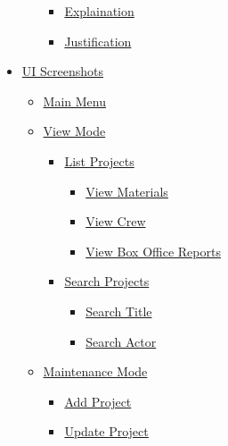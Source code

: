 \documentclass[
  english,
  a4paper,
,tablecaptionabove
]{scrartcl}
\providecommand{\tightlist}{%
  \setlength{\itemsep}{0pt}\setlength{\parskip}{0pt}}
\begin{document}
\begin{itemize}
\begin{itemize}
    \begin{itemize}
    \tightlist
    \item
      \protect\hyperlink{explaination-1}{Explaination}
    \item
      \protect\hyperlink{justification-1}{Justification}
    \end{itemize}
  \end{itemize}
\item
  \protect\hyperlink{ui-screenshots}{UI Screenshots}

  \begin{itemize}
  \tightlist
  \item
    \protect\hyperlink{main-menu}{Main Menu}
  \item
    \protect\hyperlink{view-mode}{View Mode}

    \begin{itemize}
    \tightlist
    \item
      \protect\hyperlink{list-projects}{List Projects}

      \begin{itemize}
      \tightlist
      \item
        \protect\hyperlink{view-materials}{View Materials}
      \item
        \protect\hyperlink{view-crew}{View Crew}
      \item
        \protect\hyperlink{view-box-office-reports}{View Box Office
        Reports}
      \end{itemize}
    \item
      \protect\hyperlink{search-projects}{Search Projects}

      \begin{itemize}
      \tightlist
      \item
        \protect\hyperlink{search-title}{Search Title}
      \item
        \protect\hyperlink{search-actor}{Search Actor}
      \end{itemize}
    \end{itemize}
  \item
    \protect\hyperlink{maintenance-mode}{Maintenance Mode}

    \begin{itemize}
    \tightlist
    \item
      \protect\hyperlink{add-project}{Add Project}
    \item
      \protect\hyperlink{update-project}{Update Project}


\end{itemize}
\end{itemize}
\end{itemize}
\end{document}
